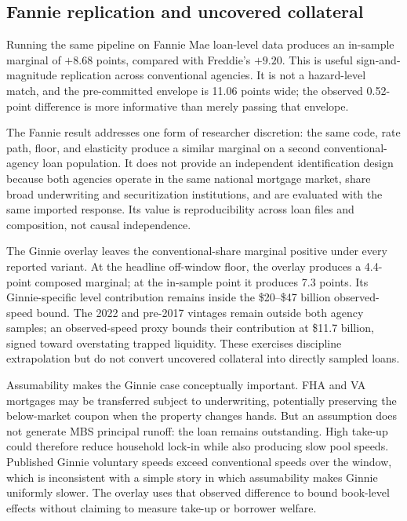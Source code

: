 \subsection{Fannie replication and uncovered collateral}

Running the same pipeline on Fannie Mae loan-level data produces an in-sample marginal of $+8.68$ points, compared with Freddie's $+9.20$. This is useful sign-and-magnitude replication across conventional agencies. It is not a hazard-level match, and the pre-committed envelope is 11.06 points wide; the observed 0.52-point difference is more informative than merely passing that envelope.

The Fannie result addresses one form of researcher discretion: the same code, rate path, floor, and elasticity produce a similar marginal on a second conventional-agency loan population. It does not provide an independent identification design because both agencies operate in the same national mortgage market, share broad underwriting and securitization institutions, and are evaluated with the same imported response. Its value is reproducibility across loan files and composition, not causal independence.

The Ginnie overlay leaves the conventional-share marginal positive under every reported variant. At the headline off-window floor, the overlay produces a 4.4-point composed marginal; at the in-sample point it produces 7.3 points. Its Ginnie-specific level contribution remains inside the \$20--\$47 billion observed-speed bound. The 2022 and pre-2017 vintages remain outside both agency samples; an observed-speed proxy bounds their contribution at \$11.7 billion, signed toward overstating trapped liquidity. These exercises discipline extrapolation but do not convert uncovered collateral into directly sampled loans.

Assumability makes the Ginnie case conceptually important. FHA and VA mortgages may be transferred subject to underwriting, potentially preserving the below-market coupon when the property changes hands. But an assumption does not generate MBS principal runoff: the loan remains outstanding. High take-up could therefore reduce household lock-in while also producing slow pool speeds. Published Ginnie voluntary speeds exceed conventional speeds over the window, which is inconsistent with a simple story in which assumability makes Ginnie uniformly slower. The overlay uses that observed difference to bound book-level effects without claiming to measure take-up or borrower welfare.

